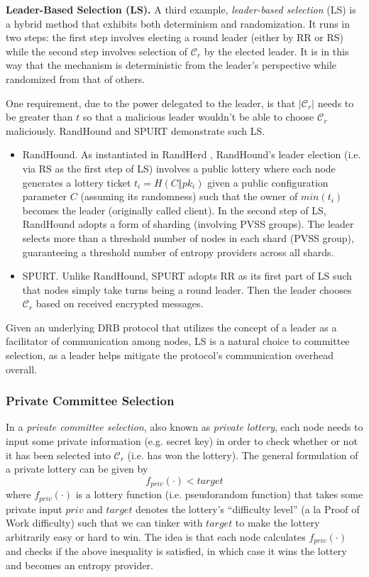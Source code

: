 \documentclass[letterpaper,twocolumn,10pt]{article}
\theoremstyle{definition}
\theoremstyle{remark}
\begin{document}
\noindent\textbf{Leader-Based Selection (LS).} A third example, \textit{leader-based selection} (LS) is a hybrid method that exhibits both determinism and randomization. It runs in two steps: the first step involves electing a round leader (either by RR or RS) while the second step involves selection of $\mathcal{C}_r$ by the elected leader. It is in this way that the mechanism is deterministic from the leader's perspective while randomized from that of others.

One requirement, due to the power delegated to the leader, is that $|\mathcal{C}_r|$ needs to be greater than $t$ so that a malicious leader wouldn't be able to choose $\mathcal{C}_r$ maliciously. RandHound \cite{syta2017scalable} and SPURT \cite{das2021spurt} demonstrate such LS.
\begin{itemize}
\item RandHound. As instantiated in RandHerd \cite{syta2017scalable}, RandHound's leader election (i.e. via RS as the first step of LS) involves a public lottery where each node generates a lottery ticket $t_i = H(C \mathbin\Vert pk_i)$ given a public configuration parameter $C$ (assuming its randomness) such that the owner of $min(t_i)$ becomes the leader (originally called client). In the second step of LS, RandHound adopts a form of sharding (involving PVSS groups). The leader selects more than a threshold number of nodes in each shard (PVSS group), guaranteeing a threshold number of entropy providers across all shards.
\item SPURT. Unlike RandHound, SPURT adopts RR as its first part of LS such that nodes simply take turns being a round leader. Then the leader chooses $\mathcal{C}_r$ based on received encrypted messages.
\end{itemize}

Given an underlying DRB protocol that utilizes the concept of a leader as a facilitator of communication among nodes, LS is a natural choice to committee selection, as a leader helps mitigate the protocol's communication overhead overall.

\subsubsection{Private Committee Selection}
\label{subsubsection:private-committee-selection}
In a \textit{private committee selection}, also known as \textit{private lottery}, each node needs to input some private information (e.g. secret key) in order to check whether or not it has been selected into $\mathcal{C}_r$ (i.e. has won the lottery). The general formulation of a private lottery can be given by
\[
f_{priv}(\cdot) < target
\]
where $f_{priv}(\cdot)$ is a lottery function (i.e. pseudorandom function) that takes some private input $priv$ and $target$ denotes the lottery's ``difficulty level'' (a la Proof of Work difficulty) such that we can tinker with $target$ to make the lottery arbitrarily easy or hard to win. The idea is that each node calculates $f_{priv}(\cdot)$ and checks if the above inequality is satisfied, in which case it wins the lottery and becomes an entropy provider.
\end{document}
